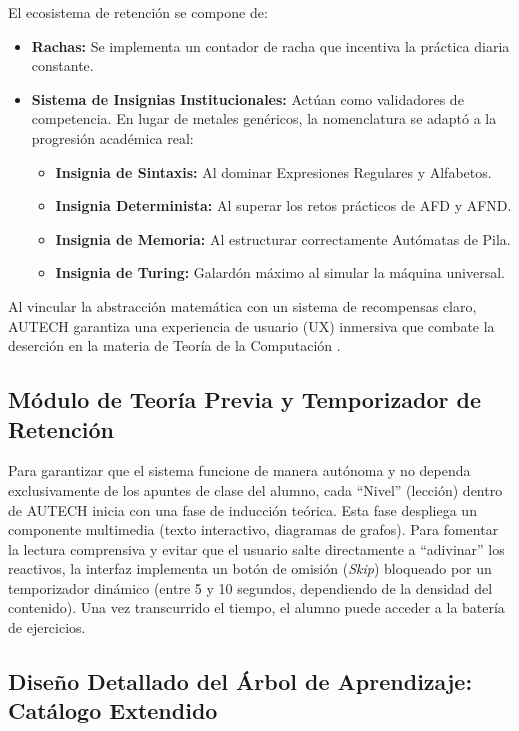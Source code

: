 El ecosistema de retención se compone de:

\begin{itemize}
    \item \textbf{Rachas:} Se implementa un contador de racha que incentiva la práctica diaria
    constante.

    \item \textbf{Sistema de Insignias Institucionales:} Actúan como validadores de competencia.
    En lugar de metales genéricos, la nomenclatura se adaptó a la progresión académica real:
    \begin{itemize}
        \item \textbf{Insignia de Sintaxis:} Al dominar Expresiones Regulares y Alfabetos.
        \item \textbf{Insignia Determinista:} Al superar los retos prácticos de AFD y AFND.
        \item \textbf{Insignia de Memoria:} Al estructurar correctamente Autómatas de Pila.
        \item \textbf{Insignia de Turing:} Galardón máximo al simular la máquina universal.
    \end{itemize}
\end{itemize}

Al vincular la abstracción matemática con un sistema de recompensas claro, AUTECH garantiza una
experiencia de usuario (UX) inmersiva que combate la deserción en la materia de Teoría de la
Computación \cite{munoz2012}\cite{deterding2011}.

\subsection{Módulo de Teoría Previa y Temporizador de Retención}
\label{subsec:teoria_previa}

Para garantizar que el sistema funcione de manera autónoma y no dependa exclusivamente de los
apuntes de clase del alumno, cada ``Nivel'' (lección) dentro de AUTECH inicia con una fase de
inducción teórica. Esta fase despliega un componente multimedia (texto interactivo, diagramas de
grafos). Para fomentar la lectura comprensiva y evitar que el usuario salte directamente a
``adivinar'' los reactivos, la interfaz implementa un botón de omisión (\textit{Skip}) bloqueado
por un temporizador dinámico (entre 5 y 10 segundos, dependiendo de la densidad del contenido).
Una vez transcurrido el tiempo, el alumno puede acceder a la batería de ejercicios.

\subsection{Diseño Detallado del Árbol de Aprendizaje: Catálogo Extendido}
\label{subsec:arbol_aprendizaje}

